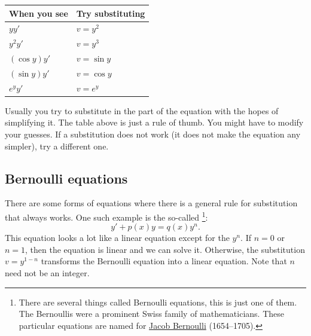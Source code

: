 \begin{center}
\begin{tabular}{@{}ll@{}}
\toprule
When you see & Try substituting \\
\midrule
$yy'$ & $v=y^2$ \\
$y^2y'$ & $v=y^3$ \\
$(\cos y)y'$ & $v=\sin y$ \\
$(\sin y)y'$ & $v=\cos y$ \\
$e^y y'$ & $v=e^y$ \\ \bottomrule
\end{tabular}
\end{center}

Usually you try to substitute in the  part of the
equation with the hopes of simplifying it.  The table above is just a rule
of thumb.  You might have to modify your guesses.  If a substitution
does not work (it does not make the equation any simpler), try a different one.

\subsection{Bernoulli equations}

There are some forms of equations where there is a
general rule for substitution that always works.
One such example is the so-called
\emph{}%
\footnote{There are several things called Bernoulli equations, this is just one
of them.  The Bernoullis were a prominent Swiss family of mathematicians.  These
particular equations are named for
\href{https://en.wikipedia.org/wiki/Jacob_Bernoulli}{Jacob Bernoulli} (1654--1705).}:
\begin{equation*}
y' + p(x)y = q(x)y^n .
\end{equation*}
This equation
looks a lot like a linear equation except for the $y^n$.  If $n=0$ or
$n=1$, then the equation is linear and we can solve it.  Otherwise,
the substitution $v=y^{1-n}$ transforms the 
Bernoulli equation into a linear equation.  Note that $n$
need not be an integer.

